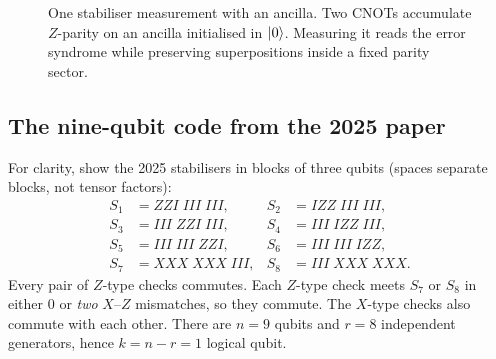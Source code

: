 \begin{figure}[htbp]
\centering
{}
\caption{One stabiliser measurement with an ancilla. Two CNOTs accumulate $Z$-parity on an ancilla initialised in $\left\lvert 0\right\rangle$. Measuring it reads the error syndrome while preserving superpositions inside a fixed parity sector.}
\label{fig:syndromecircuit}
\end{figure}

\subsection{The nine-qubit code from the 2025 paper}
For clarity, show the 2025 stabilisers in blocks of three qubits (spaces separate blocks, not tensor factors):
\begin{equation}\label{eq:shorcheck}
\begin{aligned}
S_1&=ZZI\;III\;III,& S_2&=IZZ\;III\;III,\\
S_3&=III\;ZZI\;III,& S_4&=III\;IZZ\;III,\\
S_5&=III\;III\;ZZI,& S_6&=III\;III\;IZZ,\\
S_7&=XXX\;XXX\;III,& S_8&=III\;XXX\;XXX.
\end{aligned}
\end{equation}
Every pair of $Z$-type checks commutes. Each $Z$-type check meets $S_7$ or $S_8$ in either $0$ or \emph{two} $X$--$Z$ mismatches, so they commute. The $X$-type checks also commute with each other. There are $n=9$ qubits and $r=8$ independent generators, hence $k=n-r=1$ logical qubit.

